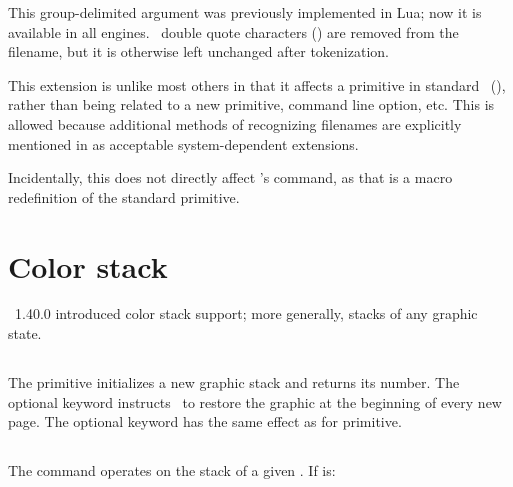 \documentclass{pdftexmanual}
\begin{document}
This group-delimited argument was previously implemented in Lua\TEX; now
it is available in all engines. \ASCII\ double quote characters
() are removed from the filename, but it is otherwise left
unchanged after tokenization.

This extension is unlike most others in that it affects a primitive in
standard \TEX\ (), rather than being related to a new
primitive, command line option, etc. This is allowed because additional
methods of recognizing filenames are explicitly mentioned in
 as acceptable system-dependent extensions.

Incidentally, this does not directly affect \LATEX's 
command, as that is a macro redefinition of the standard 
primitive.


\section{Color stack}

\PDFTEX\ 1.40.0 introduced color stack support; more generally, stacks
of any graphic state.

\subsection{}

The primitive initializes a new graphic stack and returns its number.
The optional  keyword instructs \PDFTEX\ to restore the
graphic at the beginning of every new page. The optional
 keyword has the same effect as for 
primitive. 

\subsection{}
\noindent {} \Means
   \Or {} \Or {} \Or {}

The command operates on the stack of a given .
If  is:
\end{document}
